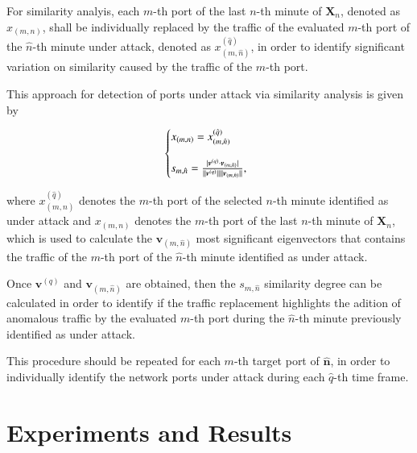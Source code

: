 \documentclass[review]{elsarticle}
\DeclarePairedDelimiter\abs{\lvert}{\rvert}%
\DeclarePairedDelimiter\norm{\lVert}{\rVert}%
\begin{document}
For similarity analyis, each $m$-th port of the last $n$-th minute of $\boldsymbol{X}_n$, denoted as $x_{(m,n)}$, shall be individually replaced by the traffic of the evaluated $m$-th port of the $\hat{n}$-th minute under attack, denoted as $x^{(\hat{q})}_{(m,\hat{n})}$, in order to identify significant variation on similarity caused by the traffic of the $m$-th port. 

This approach for detection of ports under attack via similarity analysis is given by

\begin{equation}\label{eq:eq15}
  \left\{
  \begin{array}{@{}ll@{}}
    x_{(m,n)} = x^{(\hat{q})}_{(m,\hat{n})} \\
    \\
    s_{m,\hat{n}} = \frac{\abs{\boldsymbol{v}^{(q)} \cdot \boldsymbol{v}_{(m,\hat{n})}}}{\norm{\boldsymbol{v}^{(q)}}\norm{\boldsymbol{v}_{(m,\hat{n})}}},
  \end{array}\right.
\end{equation}

where $x^{(\hat{q})}_{(m,\hat{n})}$ denotes the $m$-th port of the selected $n$-th minute identified as under attack and $x_{(m,n)}$ denotes the $m$-th port of the last $n$-th minute of $\boldsymbol{X}_n$, which is used to calculate the $\boldsymbol{v}_{(m,\hat{n})}$ most significant eigenvectors that contains the traffic of the $m$-th port of the $\hat{n}$-th minute identified as under attack.

Once $\boldsymbol{v}^{(q)}$ and $\boldsymbol{v}_{(m,\hat{n})}$ are obtained, then the $s_{m,\hat{n}}$ similarity degree can be calculated in order to identify if the traffic replacement highlights the adition of anomalous traffic by the evaluated $m$-th port during the $\hat{n}$-th minute previously identified as under attack. 

This procedure should be repeated for each $m$-th target port of $\boldsymbol{\hat{n}}$, in order to individually identify the network ports under attack during each $\hat{q}$-th time frame.

\section{Experiments and Results}
\label{sec:experimentalresults}
\end{document}
